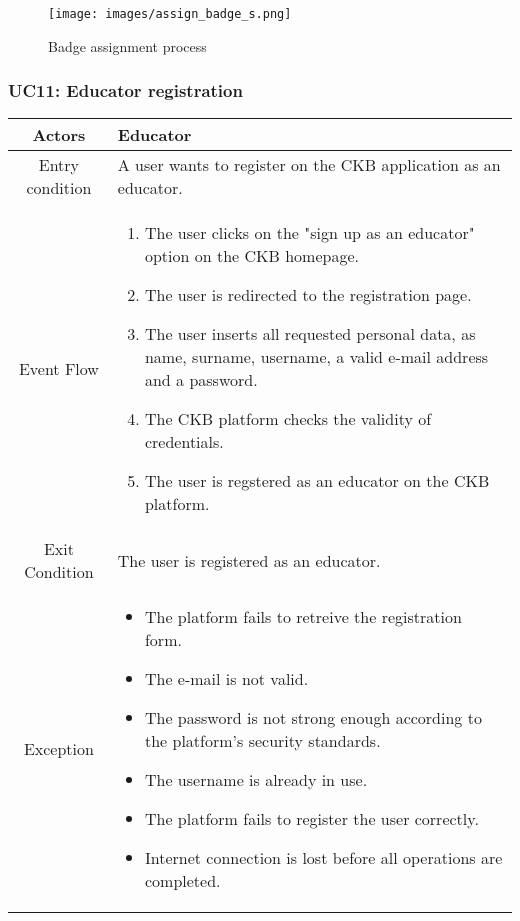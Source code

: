 \documentclass[a4paper, 11pt, titlepage]{article}
\begin{document}
\begin{figure}[h!]
    \centering
    \texttt{[image: images/assign\_badge\_s.png]}
    \caption{Badge assignment process}
    \label{fig:seq_diag_assign_badge}
    
\end{figure}

\clearpage

\subsubsection*{UC11: Educator registration}

\begin{center}
    \begin{tabularx}{\linewidth} {|c|X|}
        \hline 
        Actors & Educator\\
        \hline 
        Entry condition &
        A user wants to register on the CKB application as an educator.\\
        \hline 
        Event Flow &
        \begin{enumerate}
            \item The user clicks on the "sign up as an educator" option on the CKB homepage.
            \item The user is redirected to the registration page.
            \item The user inserts all requested personal data, as name, surname, username, a valid e-mail address and a password.
            \item The CKB platform checks the validity of credentials.
            \item The user is regstered as an educator on the CKB platform.
        \end{enumerate}\\
        \hline 
        Exit Condition &
        The user is registered as an educator.\\
        \hline 
        Exception & 
        \begin{itemize}
            \item The platform fails to retreive the registration form.
            \item The e-mail is not valid.
            \item The password is not strong enough according to the platform's security standards.
            \item The username is already in use.
            \item The platform fails to register the user correctly.
            \item Internet connection is lost before all operations are completed. 
        \end{itemize}\\
        \hline
    \end{tabularx}
\end{center}
\end{document}

